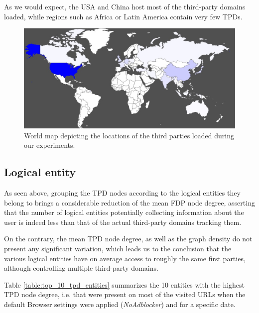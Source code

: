 \documentclass{sig-alternate}
\begin{document}
As we would expect, the USA and China host most of the third-party domains loaded, while regions such as Africa or Latin America contain very few TPDs.

\begin{figure}
 \centering
 \includegraphics[width=\textwidth]{figures/third_party_map.eps}
 \caption{World map depicting the locations of the third parties loaded during our experiments.}
 \label{fig:third_party_map}
\end{figure}


\subsection{Logical entity}

As seen above, grouping the TPD nodes according to the logical entities they belong to brings a considerable reduction of the mean FDP node degree, asserting that the number of logical entities potentially collecting information about the user is indeed less than that of the actual third-party domains tracking them.

On the contrary, the mean TPD node degree, as well as the graph density do not present any significant variation, which leads us to the conclusion that the various logical entities have on average access to roughly the same first parties, although controlling multiple third-party domains.

Table \ref{table:top_10_tpd_entities} summarizes the 10 entities with the highest TPD node degree, i.e. that were present on most of the visited URLs when the default Browser settings were applied (\textit{NoAdblocker}) and for a specific date.
\end{document}
